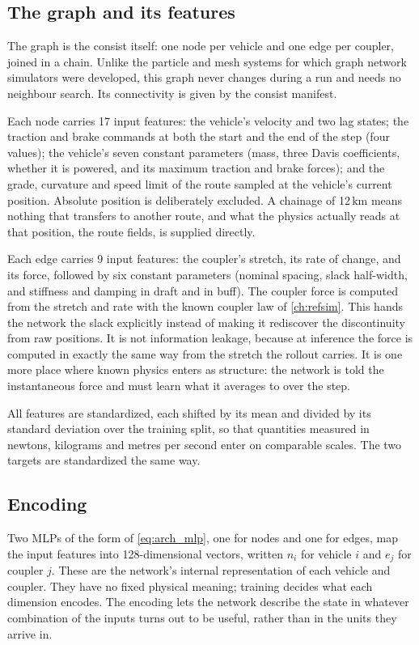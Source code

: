 \subsection{The graph and its features}

The graph is the consist itself: one node per vehicle and one edge per coupler, joined in a chain. Unlike the particle and mesh systems for which graph network simulators were developed, this graph never changes during a run and needs no neighbour search. Its connectivity is given by the consist manifest.

Each node carries 17 input features: the vehicle's velocity and two lag states; the traction and brake commands at both the start and the end of the step (four values); the vehicle's seven constant parameters (mass, three Davis coefficients, whether it is powered, and its maximum traction and brake forces); and the grade, curvature and speed limit of the route sampled at the vehicle's current position. Absolute position is deliberately excluded. A chainage of 12\,km means nothing that transfers to another route, and what the physics actually reads at that position, the route fields, is supplied directly.

Each edge carries 9 input features: the coupler's stretch, its rate of change, and its force, followed by six constant parameters (nominal spacing, slack half-width, and stiffness and damping in draft and in buff). The coupler force is computed from the stretch and rate with the known coupler law of \cref{ch:refsim}. This hands the network the slack explicitly instead of making it rediscover the discontinuity from raw positions. It is not information leakage, because at inference the force is computed in exactly the same way from the stretch the rollout carries. It is one more place where known physics enters as structure: the network is told the instantaneous force and must learn what it averages to over the step.

All features are standardized, each shifted by its mean and divided by its standard deviation over the training split, so that quantities measured in newtons, kilograms and metres per second enter on comparable scales. The two targets are standardized the same way.

\subsection{Encoding}

Two MLPs of the form of \cref{eq:arch_mlp}, one for nodes and one for edges, map the input features into 128-dimensional vectors, written $n_i$ for vehicle $i$ and $e_j$ for coupler $j$. These are the network's internal representation of each vehicle and coupler. They have no fixed physical meaning; training decides what each dimension encodes. The encoding lets the network describe the state in whatever combination of the inputs turns out to be useful, rather than in the units they arrive in.

